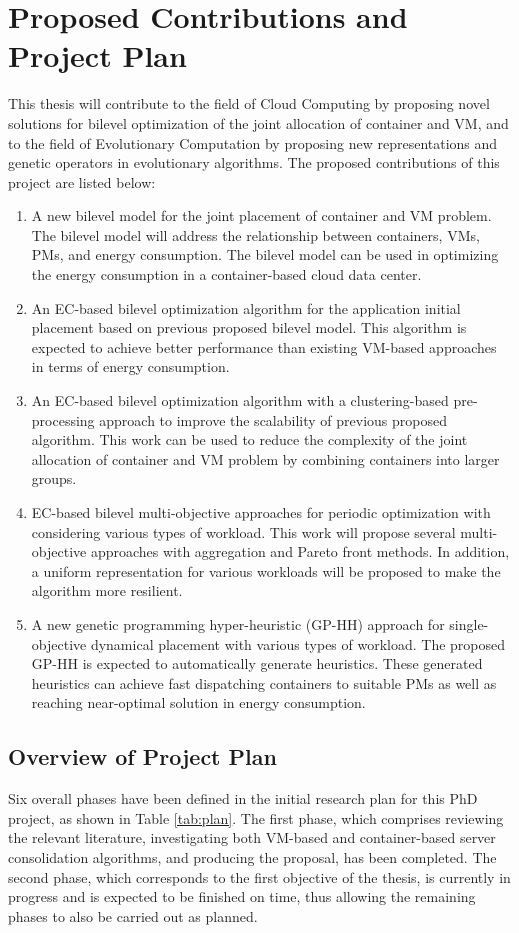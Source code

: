 \chapter{Proposed Contributions and Project Plan}\label{C:con}

This thesis will contribute to the field of Cloud Computing by proposing novel solutions for bilevel optimization of the joint allocation of container and VM, and to the field of Evolutionary Computation by proposing new representations and genetic operators in evolutionary algorithms. The proposed contributions of this project are listed below:
 
\begin{enumerate}
	\item A new bilevel model for the joint placement of container and VM problem.  The bilevel model will address the relationship between containers, VMs, PMs, and energy consumption. The bilevel model can be used in optimizing the energy consumption in a container-based cloud data center.
	\item An EC-based bilevel optimization algorithm for the application initial placement based on previous proposed bilevel model. This algorithm is expected to achieve better performance than existing VM-based approaches in terms of energy consumption. 
	\item An EC-based bilevel optimization algorithm with a clustering-based pre-processing approach to improve the scalability of previous proposed algorithm. This work can be used to reduce the complexity of the joint allocation of container and VM problem by combining containers into larger groups.
	\item EC-based bilevel multi-objective approaches for periodic optimization with considering various types of workload.
	This work will propose several multi-objective approaches with aggregation and Pareto front methods. In addition, a uniform representation for various workloads will be proposed to make the algorithm more resilient.
	\item A new genetic programming hyper-heuristic (GP-HH) approach for single-objective dynamical placement with various types of workload. The proposed GP-HH is expected to automatically generate heuristics. These generated heuristics can achieve fast dispatching containers to suitable PMs as well as reaching near-optimal solution in energy consumption.
\end{enumerate}

\section{Overview of Project Plan}
Six overall phases have been defined in the initial research plan for this PhD project, as
shown in Table \ref{tab:plan}. The first phase, which comprises reviewing the relevant literature, investigating both VM-based and container-based server consolidation algorithms, and producing the proposal, has
been completed. The second phase, which corresponds to the first objective of the thesis, is
currently in progress and is expected to be finished on time, thus allowing the remaining
phases to also be carried out as planned.


